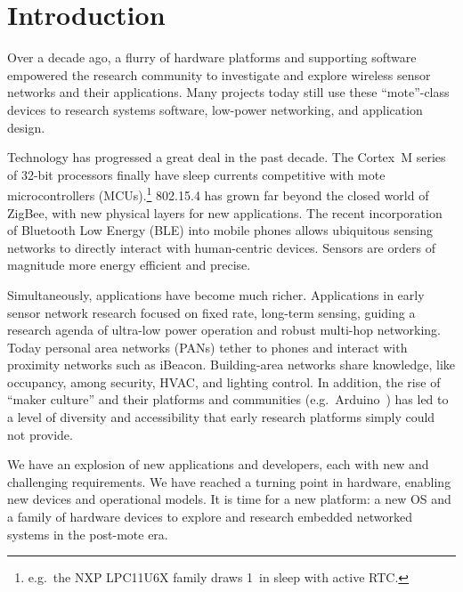 \section{Introduction}
\label{sec:intro}

Over a decade ago, a flurry of hardware platforms and supporting software
empowered the research community to investigate and explore wireless sensor
networks and their applications. Many projects today still use these
``mote''-class devices to research systems software, low-power
networking, and application design.
%

Technology has progressed a
great deal in the past decade. The Cortex~M series of 32-bit processors
finally have sleep currents competitive with mote microcontrollers
(MCUs).\footnote{
  e.g.\ the NXP LPC11U6X family draws 1~\uA in sleep with active RTC.
}
802.15.4 has grown far beyond the closed world of ZigBee, with
new physical layers for new applications. The recent incorporation of
Bluetooth Low Energy (BLE) into mobile phones allows ubiquitous sensing
networks to directly interact with human-centric devices. Sensors
are orders of magnitude more energy efficient and precise.

Simultaneously, applications have become much richer. Applications in
early sensor network research focused on fixed rate, long-term
sensing, guiding a research agenda of ultra-low power operation and
robust multi-hop networking.  Today personal area networks (PANs)
tether to phones and interact with proximity networks such as iBeacon.
Building-area networks share knowledge, like occupancy, among
security, HVAC, and lighting control.  In addition, the rise of
``maker culture'' and their platforms and communities (e.g.\
Arduino~\cite{arduino}) has led to a level of diversity and
accessibility that early research platforms simply could not provide.

We have an explosion of new applications and developers, each with new
and challenging requirements. We have reached a turning point in
hardware, enabling new devices and operational models. It is time for
a new platform: a new OS and a family of hardware devices to explore
and research embedded networked systems in the post-mote era.


